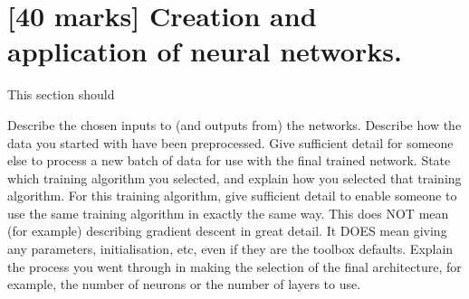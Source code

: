 \documentclass[11pt,a4paper]{article}
\begin{document}



\section{[40 marks] Creation and application of neural networks.}
This section should
\begin{outline}
  \1 Describe the chosen inputs to (and outputs from) the networks.
  \1 Describe how the data you started with have been preprocessed.
  \1 Give sufficient detail for someone else to process a new batch of data for use with the final trained network.
  \1 State which training algorithm you selected, and explain how you selected that training algorithm. For this training algorithm, give sufficient detail to enable someone to use the same training algorithm in exactly the same way. This does NOT mean (for example) describing gradient descent in great detail. It DOES mean giving any parameters, initialisation, etc, even if they are the toolbox defaults.
  \1 Explain the process you went through in making the selection of the final architecture, for example, the number of neurons or the number of layers to use.
\end{outline}


\end{document}
